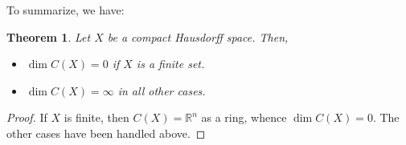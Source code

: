 \documentclass[12pt]{article}
\theoremstyle{thmstyle}
\newtheorem{theorem}{Theorem}[section]
\theoremstyle{defstyle}
\newcommand{\R}{\mathbb{R}}
\begin{document}
To summarize, we have: 
\begin{theorem}
    Let $X$ be a compact Hausdorff space. Then, 
    \begin{itemize}
        \item $\dim C(X) = 0$ if $X$ is a finite set. 
        \item $\dim C(X) = \infty$ in all other cases.
    \end{itemize}
\end{theorem}
\begin{proof}
    If $X$ is finite, then $C(X) = \R^n$ as a ring, whence $\dim C(X) = 0$. The other cases have been handled above.
\end{proof}
\end{document}
